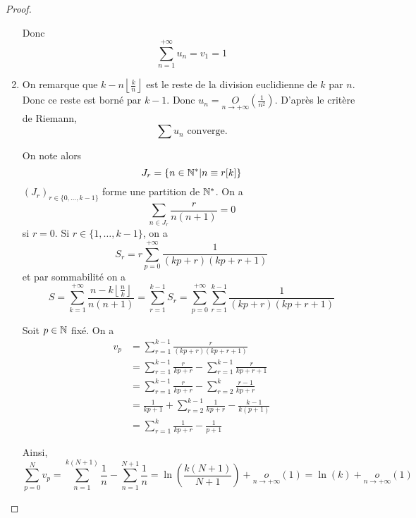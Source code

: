 \documentclass[12pt]{article}
\begin{document}
\begin{proof}
\begin{enumerate}
		Donc 
		\begin{equation}\boxed{\sum_{n=1}^{+\infty}u_{n}=v_{1}=1}\end{equation}

		\item On remarque que $k-n\left\lfloor\frac{k}{n}\right\rfloor$ est le reste de la division euclidienne de $k$ par $n$. Donc ce reste est borné par $k-1$. Donc $u_{n}=\underset{n\to+\infty}{O}\left(\frac{1}{n^{2}}\right)$. D'après le critère de Riemann,
		\begin{equation}\boxed{\sum u_{n}\text{ converge.}}\end{equation}

		On note alors 
		\begin{equation}J_{r}=\left\{n\in\mathbb{N}^{*}\middle| n\equiv r[k]\right\}\end{equation}
		$(J_{r})_{r\in\{0,\dots,k-1\}}$ forme une partition de $\mathbb{N}^{*}$. On a 
		\begin{equation}\sum_{n\in J_{r}}\frac{r}{n(n+1)}=0\end{equation}
		si $r=0$. Si $r\in\{1,\dots,k-1\}$, on a 
		\begin{equation}S_{r}=r\sum_{p=0}^{+\infty}\frac{1}{(kp+r)(kp+r+1)}\end{equation}
		et par sommabilité on a 
		\begin{equation}S=\sum_{k=1}^{+\infty}\frac{n-k\left\lfloor\frac{n}{k}\right\rfloor}{n(n+1)}=\sum_{r=1}^{k-1}S_{r}=\sum_{p=0}^{+\infty}\sum_{r=1}^{k-1}\frac{1}{(kp+r)(kp+r+1)}\end{equation}

		Soit $p\in\mathbb{N}$ fixé. On a 
		\begin{align}
			v_{p}
			&=\sum_{r=1}^{k-1}\frac{r}{(kp+r)(kp+r+1)}\\
			&=\sum_{r=1}^{k-1}\frac{r}{kp+r}-\sum_{r=1}^{k-1}\frac{r}{kp+r+1}\\
			&=\sum_{r=1}^{k-1}\frac{r}{kp+r}-\sum_{r=2}^{k}\frac{r-1}{kp+r}\\
			&=\frac{1}{kp+1}+\sum_{r=2}^{k-1}\frac{1}{kp+r}-\frac{k-1}{k(p+1)}\\
			&=\sum_{r=1}^{k}\frac{1}{kp+r}-\frac{1}{p+1}
		\end{align}

		Ainsi, 
		\begin{equation}\sum_{p=0}^{N}v_{p}=\sum_{n=1}^{k(N+1)}\frac{1}{n}-\sum_{n=1}^{N+1}\frac{1}{n}=\ln\left(\frac{k(N+1)}{N+1}\right)+\underset{n\to+\infty}{o}\left(1\right)=\ln(k)+\underset{n\to+\infty}{o}\left(1\right)\end{equation}


\end{enumerate}
\end{proof}
\end{document}
